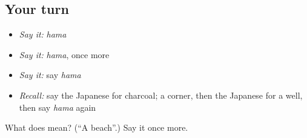 \subsection*{Your turn}
\begin{itemize}
\raggedright
  \item \emph{Say it:} \emph{hama}
  \item \emph{Say it:} \emph{hama}, once more
  \item \emph{Say it:} say \emph{hama}
  \item \emph{Recall:} say the Japanese for charcoal; a corner, then the Japanese for a well, then say \emph{hama} again
\end{itemize}

\begin{tcolorbox}[breakable,colback=teal!4,colframe=teal!35!black,title={Before you move on}]
What does  mean? (\textquotedblleft{}A beach\textquotedblright{}.) Say it once more.
\end{tcolorbox}
